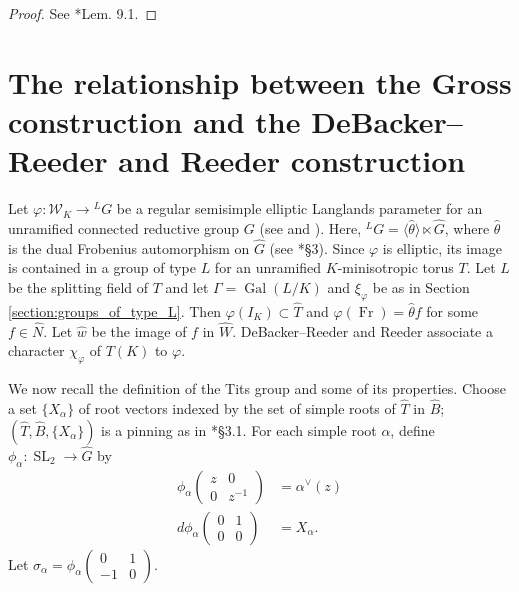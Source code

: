 \documentclass{compositio}
\theoremstyle{plain}
\theoremstyle{definition}
\numberwithin{equation}{section}
\DeclareMathOperator{\Gal}{Gal}
\DeclareMathOperator{\Fr}{Fr}
\DeclareMathOperator{\SL}{SL}
\newcommand{\Weil}{\mathcal{W}}
\begin{document}
\begin{proof}
See \cite{adrian-lansky:ppa}*{Lem. 9.1}.
\end{proof}

\section{The relationship between the Gross construction and the DeBacker--Reeder and Reeder construction}
\label{section:gross_debacker_reeder}

Let $\varphi : \Weil_K \rightarrow {}^L G$ be a regular semisimple elliptic Langlands
parameter for an unramified connected reductive group $G$
(see \cite{reeder-debacker:09a} and \cite{reeder:08a}).
Here, ${}^L G = \langle \hat{\theta} \rangle \ltimes \hat{G}$,
where $\hat{\theta}$ is the dual Frobenius automorphism on $\hat{G}$
(see \cite{reeder-debacker:09a}*{\S 3}).
Since $\varphi$ is elliptic, its image is contained in a group of type $L$ for an unramified $K$-minisotropic torus $T$.
Let $L$ be the splitting field of $T$ and let $\Gamma = \Gal(L/K)$ and $\xi_\varphi$ be as in Section \ref{section:groups_of_type_L}.
Then $\varphi(I_K) \subset \hat{T}$ and
$\varphi(\Fr) = \hat{\theta} f$ for some $f \in \hat{N}$.  Let $\hat{w}$
be the image of $f$ in $\hat{W}$.
DeBacker--Reeder \cite{reeder-debacker:09a} and Reeder \cite{reeder:08a}
associate a character $\chi_{\varphi}$ of $T(K)$ to $\varphi$.

We now recall the definition of
the Tits group and some of its properties.  Choose a set $\{ X_{\alpha} \}$ of root vectors
indexed by the set of simple roots of $\hat{T}$ in $\hat{B}$; $(\hat{T}, \hat{B}, \{X_{\alpha} \})$
is a pinning as in \cite{reeder:10a}*{\S 3.1}.
For each simple root $\alpha$, define $\phi_{\alpha} : \SL_2 \rightarrow \hat{G}$
by
\begin{align*}
\phi_{\alpha}\begin{pmatrix}z & 0 \\ 0 & z^{-1}\end{pmatrix} &= \alpha^{\vee}(z) \\
d \phi_{\alpha}\begin{pmatrix}0 & 1 \\ 0 & 0\end{pmatrix} &= X_{\alpha}.
\end{align*}
Let $\sigma_{\alpha} = \phi_{\alpha}\begin{pmatrix}0 & 1 \\ -1 & 0\end{pmatrix}$.
\end{document}

